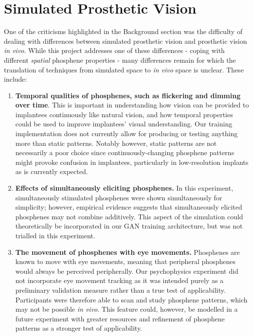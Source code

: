 \documentclass[a4paper,11pt,openany]{book}
\begin{document}
\section*{Simulated Prosthetic Vision}
\label{sec:org4363826}

One of the criticisms highlighted in the Background section was the difficulty of dealing with differences between simulated prosthetic vision and prosthetic vision \emph{in vivo}.
While this project addresses one of these differences - coping with different \emph{spatial} phosphene properties - many differences remain for which the translation of techniques from simulated space to \emph{in vivo} space is unclear.
These include:
\begin{enumerate}
\item \textbf{Temporal qualities of phosphenes, such as flickering and dimming over time}.
This is important in understanding how vision can be provided to implantees continuously like natural vision, and how temporal properties could be used to improve implantees' visual understanding.
Our training implementation does not currently allow for producing or testing anything more than static patterns.
Notably however, static patterns are not necessarily a poor choice since continuously-changing phosphene patterns might provoke confusion in implantees, particularly in low-resolution implants as is currently expected.
\item \textbf{Effects of simultaneously eliciting phosphenes.}
In this experiment, simultaneously stimulated phosphenes were shown simultaneously for simplicity; however, empirical evidence suggests that simultaneously elicited phosphenes may not combine additively.
This aspect of the simulation could theoretically be incorporated in our GAN training architecture, but was not trialled in this experiment.
\item \textbf{The movement of phosphenes with eye movements.}
Phosphenes are known to move with eye movements, meaning that peripheral phosphenes would always be perceived peripherally.
Our psychophysics experiment did not incorporate eye movement tracking as it was intended purely as a preliminary validation measure rather than a true test of applicability.
Participants were therefore able to scan and study phosphene patterns, which may not be possible \emph{in vivo}.
This feature could, however, be modelled in a future experiment with greater resources and refinement of phosphene patterns as a stronger test of applicability.
\end{enumerate}
\end{document}

